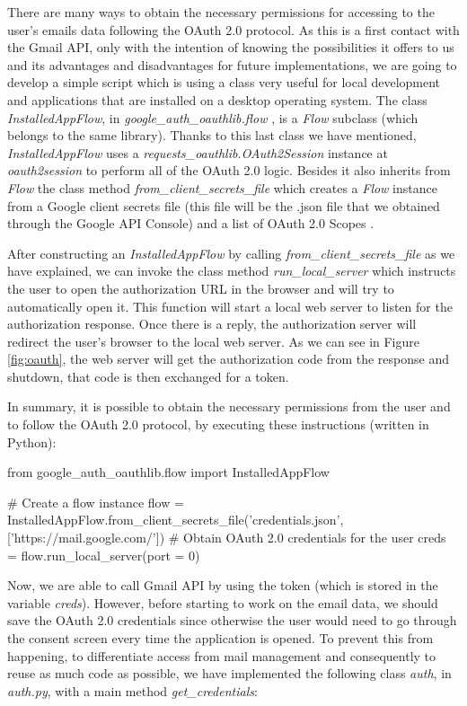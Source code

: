 There are many ways to obtain the necessary permissions for accessing to the user's emails data following the OAuth 2.0 protocol. As this is a first contact with the Gmail API, only with the intention of knowing the possibilities it offers to us and its advantages and disadvantages for future implementations, we are going to develop a simple script which is using a class very useful for local development and applications that are installed on a desktop operating system. The class \textit{InstalledAppFlow}, in \textit{google\_auth\_oauthlib.flow} \citep{oauthlib}, is a \textit{Flow} subclass (which belongs to the same library). Thanks to this last class we have mentioned, \textit{InstalledAppFlow} uses a \textit{requests\_oauthlib.OAuth2Session} instance at \textit{oauth2session} to perform all of the OAuth 2.0 logic. Besides it also inherits from \textit{Flow} the class method \textit{from\_client\_secrets\_file} which creates a \textit{Flow} instance from a Google client secrets file (this file will be the .json file that we obtained through the Google API Console) and a list of OAuth 2.0 Scopes \citep{oauth-scopes}.

After constructing an \textit{InstalledAppFlow} by calling \textit{from\_client\_secrets\_file} as we have explained, we can invoke the class method \textit{run\_local\_server} which instructs the user to open the authorization URL in the browser and will try to automatically open it. This function will start a local web server to listen for the authorization response. Once there is a reply, the authorization server will redirect the user's browser to the local web server. As we can see in Figure \ref{fig:oauth}, the web server will get the authorization code from the response and shutdown, that code is then exchanged for a token.

In summary, it is possible to obtain the necessary permissions from the user and to follow the OAuth 2.0 protocol, by executing these instructions (written in Python):

\begin{python}
	from google_auth_oauthlib.flow import InstalledAppFlow
	
	# Create a flow instance
	flow = InstalledAppFlow.from_client_secrets_file('credentials.json', 
	['https://mail.google.com/'])
	# Obtain OAuth 2.0 credentials for the user
	creds = flow.run_local_server(port = 0)
\end{python}

Now, we are able to call Gmail API by using the token (which is stored in the variable \textit{creds}). However, before starting to work on the email data, we should save the OAuth 2.0 credentials since otherwise the user would need to go through the consent screen every time the application is opened. To prevent this from happening, to differentiate access from mail management and consequently to reuse as much code as possible, we have implemented the following class \textit{auth}, in \textit{auth.py}, with a main method \textit{get\_credentials}:

